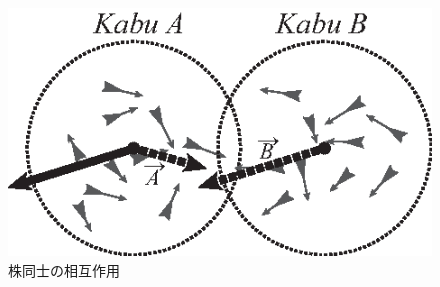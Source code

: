 \documentclass[twocolumn]{jarticle}
\begin{document}
                \begin{figure}[tbp]
                    \centering
                   \includegraphics[width=0.8\linewidth]{fig/kabus.eps}
                    \caption{株同士の相互作用}
                    \label{fig:kabus}
                \end{figure}
\end{document}
